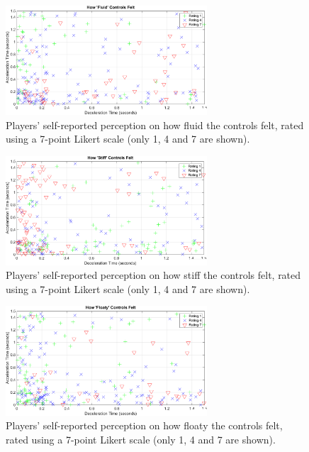 \begin{figure}[htbp]
\centering
\includegraphics[width=0.67\textwidth]{Pics/Classes/Fluid_classes}
\caption{Players' self-reported perception on how fluid the controls felt, rated using a 7-point Likert scale (only 1, 4 and 7 are shown).}
\label{fig:fluid}
\end{figure}

\begin{figure}[htbp]
\centering
\includegraphics[width=0.67\textwidth]{Pics/Classes/Stiff_classes}
\caption{Players' self-reported perception on how stiff the controls felt, rated using a 7-point Likert scale (only 1, 4 and 7 are shown).}
\label{fig:stiff}
\end{figure}

\begin{figure}[htbp]
\centering
\includegraphics[width=0.67\textwidth]{Pics/Classes/Floaty_classes}
\caption{Players' self-reported perception on how floaty the controls felt, rated using a 7-point Likert scale (only 1, 4 and 7 are shown).}
\label{fig:floaty}
\end{figure}

